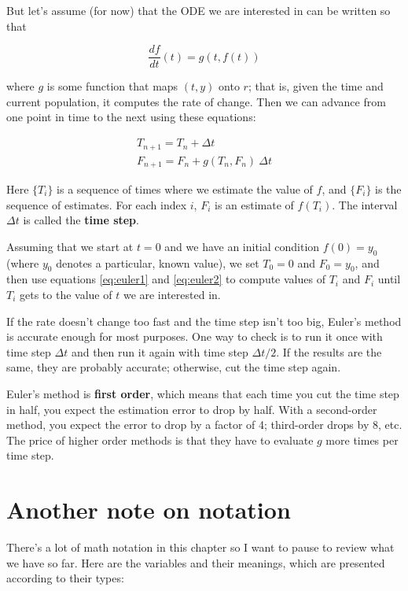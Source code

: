 \documentclass[
]{book}
\begin{document}
But let's assume (for now) that the ODE we are interested in can
be written so that

\begin{equation}\label{eq:g_ODE}
\frac{df}{dt}(t) = g(t, f(t))
\end{equation}

where $g$ is some function that maps $(t, y)$ onto $r$;
that is, given the time and current population, it computes the rate
of change.  Then we can advance from one point in time to the
next using these equations:

\begin{eqnarray}
\label{eq:euler1}
T_{n+1} = T_n + \Delta t           \\
\label{eq:euler2}
F_{n+1} = F_n + g(T_n,F_n)~\Delta t
\end{eqnarray}

Here $\{T_i\}$ is a sequence of times where we estimate the value
of $f$, and $\{F_i\}$ is the sequence of estimates.  For each
index $i$, $F_i$ is an estimate of $f(T_i)$.
The interval $\Delta t$ is called the {\bf time step}.

Assuming that we start at $t=0$ and we have an initial condition $f(0)
= y_0$ (where $y_0$ denotes a particular, known value), we set
$T_0 = 0$ and $F_0 = y_0$, and then use
equations \eqref{eq:euler1} and \eqref{eq:euler2} to
compute values of $T_i$ and $F_i$ until $T_i$
gets to the value of $t$ we are interested in.

If the rate doesn't change too fast and the time step isn't
too big, Euler's method is accurate enough for most purposes.  One
way to check is to run it once with time step $\Delta t$ and then run it
again with time step $\Delta t/2$.  If the results are the same, they are
probably accurate; otherwise, cut the time step again.

Euler's method is {\bf first order}, which means that each time you
cut the time step in half, you expect the estimation error to drop by
half.  With a second-order method, you expect the error to drop by a
factor of 4; third-order drops by 8, etc.  The price of higher order
methods is that they have to evaluate $g$ more times per time step.


\section{Another note on notation}

There's a lot of math notation in this chapter so I want to pause to
review what we have so far.  Here are the variables and their meanings,
which are presented according to their types:
\end{document}

